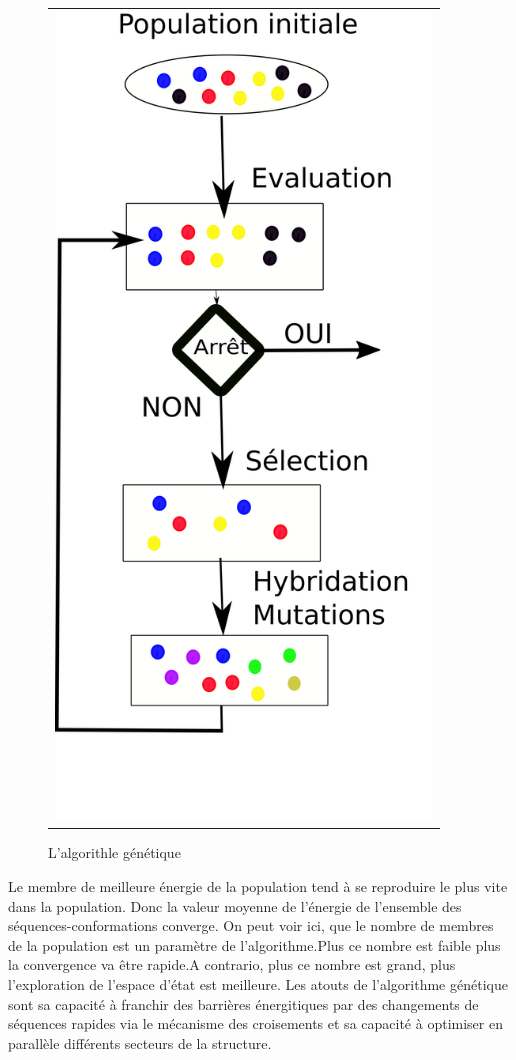 \begin{figure}[t]
  \centering
  \begin{tabular}{c}
    \includegraphics[width=10cm]{figure/algo_genetique.png} \\
  \end{tabular}
  \caption{L'algorithle génétique}
  \label{algo_gene}
\end{figure}


Le membre de meilleure énergie de la population tend à se reproduire le plus vite dans la population. 
Donc la valeur moyenne de l'énergie de l'ensemble des séquences-conformations converge.
On peut voir ici, que le nombre de membres de la population est un paramètre de l'algorithme.Plus ce nombre est faible plus la convergence va être rapide.A contrario, plus ce nombre est grand, plus l'exploration de l'espace d'état est meilleure.
Les atouts de l'algorithme génétique sont sa capacité à franchir des barrières énergitiques par des changements de séquences rapides via le mécanisme des croisements et sa capacité à optimiser en parallèle différents secteurs de la structure.


